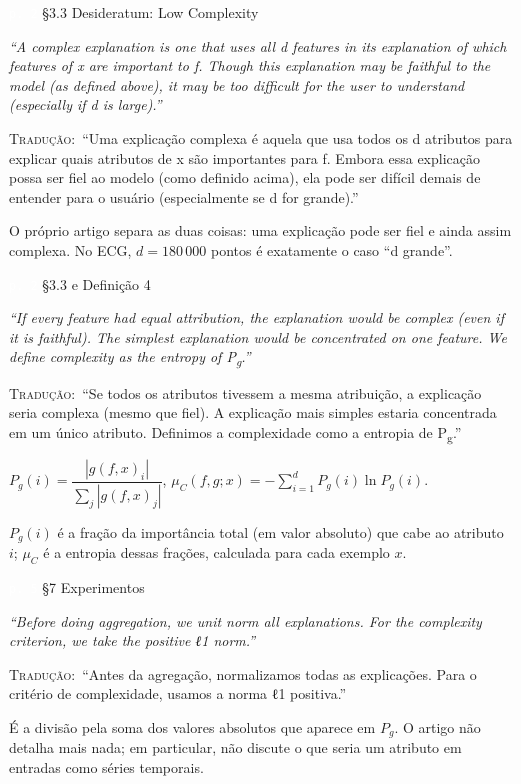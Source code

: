 \documentclass[11pt,a4paper]{article}
\newcommand{\pagechip}[1]{{\setlength{\fboxsep}{1.5pt}\colorbox{cAcc}{\textcolor{white}{\scriptsize\texttt{#1}}}}}
\newenvironment{origquote}{\par\itshape\small}{\par}
\newenvironment{tradquote}{\par\small\textsc{Tradução:}\ }{\par}
\newcommand{\explab}[1]{\par\smallskip{\small\color{cAcc}\textbf{\MakeUppercase{#1}}}\par}
\begin{document}
\begin{citacard}{\pagechip{p. 2} §3.3 Desideratum: Low Complexity}
\begin{origquote}“A complex explanation is one that uses all d features in its explanation of which features of x are important to f. Though this explanation may be faithful to the model (as defined above), it may be too difficult for the user to understand (especially if d is large).”\end{origquote}
\begin{tradquote}“Uma explicação complexa é aquela que usa todos os d atributos para explicar quais atributos de x são importantes para f. Embora essa explicação possa ser fiel ao modelo (como definido acima), ela pode ser difícil demais de entender para o usuário (especialmente se d for grande).”\end{tradquote}
\explab{Explicação}
O próprio artigo separa as duas coisas: uma explicação pode ser fiel e ainda assim complexa. No ECG, $d = 180\,000$ pontos é exatamente o caso “d grande”.
\end{citacard}

\begin{citacard}{\pagechip{p. 2} §3.3 e Definição 4}
\begin{origquote}“If every feature had equal attribution, the explanation would be complex (even if it is faithful). The simplest explanation would be concentrated on one feature. We define complexity as the entropy of P\textsubscript{g}.”\end{origquote}
\begin{tradquote}“Se todos os atributos tivessem a mesma atribuição, a explicação seria complexa (mesmo que fiel). A explicação mais simples estaria concentrada em um único atributo. Definimos a complexidade como a entropia de P\textsubscript{g}.”\end{tradquote}
\explab{Fórmula}
$P_g(i) = \dfrac{|g(f,x)_i|}{\sum_{j} |g(f,x)_j|}$, \qquad $\mu_C(f, g; x) = -\sum_{i=1}^{d} P_g(i) \ln P_g(i)$.

$P_g(i)$ é a fração da importância total (em valor absoluto) que cabe ao atributo $i$; $\mu_C$ é a entropia dessas frações, calculada para cada exemplo $x$.
\end{citacard}

\begin{citacard}{\pagechip{p. 5} §7 Experimentos}
\begin{origquote}“Before doing aggregation, we unit norm all explanations. For the complexity criterion, we take the positive ℓ1 norm.”\end{origquote}
\begin{tradquote}“Antes da agregação, normalizamos todas as explicações. Para o critério de complexidade, usamos a norma ℓ1 positiva.”\end{tradquote}
\explab{Explicação}
É a divisão pela soma dos valores absolutos que aparece em $P_g$. O artigo não detalha mais nada; em particular, não discute o que seria um atributo em entradas como séries temporais.
\end{citacard}
\end{document}
